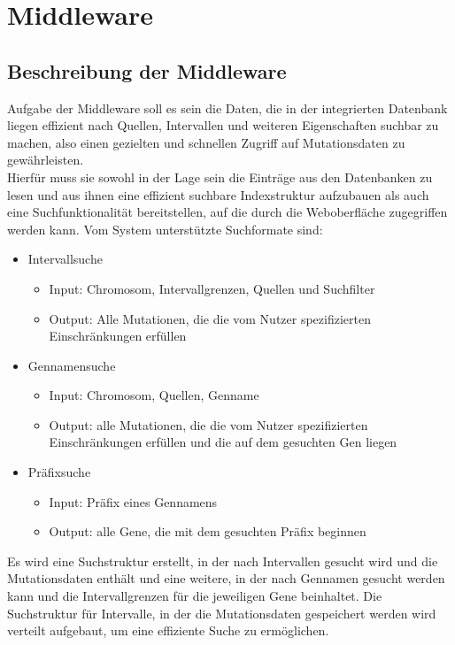 \section{Middleware}
\subsection{Beschreibung der Middleware}
Aufgabe der Middleware soll es sein die Daten, die in der integrierten Datenbank liegen effizient nach Quellen, Intervallen und weiteren Eigenschaften suchbar zu machen, also einen gezielten und schnellen Zugriff auf Mutationsdaten zu gewährleisten.\\ Hierfür muss sie sowohl in der Lage sein die Einträge aus den Datenbanken zu lesen und aus ihnen eine effizient suchbare Indexstruktur aufzubauen als auch eine Suchfunktionalität bereitstellen, auf die durch die Weboberfläche zugegriffen werden kann. Vom System unterstützte Suchformate sind:
\begin{itemize}
\item Intervallsuche
\begin{itemize}
\item Input: Chromosom, Intervallgrenzen, Quellen und Suchfilter
\item Output: Alle Mutationen, die die vom Nutzer spezifizierten Einschränkungen erfüllen
\end{itemize}
\item Gennamensuche
\begin{itemize}
\item Input: Chromosom, Quellen, Genname
\item Output: alle Mutationen, die die vom Nutzer spezifizierten Einschränkungen erfüllen und die auf dem gesuchten Gen liegen
\end{itemize}
\item Präfixsuche
\begin{itemize}
\item Input: Präfix eines Gennamens
\item Output: alle Gene, die mit dem gesuchten Präfix beginnen
\end{itemize}
\end{itemize} 
Es wird eine Suchstruktur erstellt, in der nach Intervallen gesucht wird und die Mutationsdaten enthält und eine weitere, in der nach Gennamen gesucht werden kann und die Intervallgrenzen für die jeweiligen Gene beinhaltet.
Die Suchstruktur für Intervalle, in der die Mutationsdaten gespeichert werden wird verteilt aufgebaut, um eine effiziente Suche zu ermöglichen.\\
